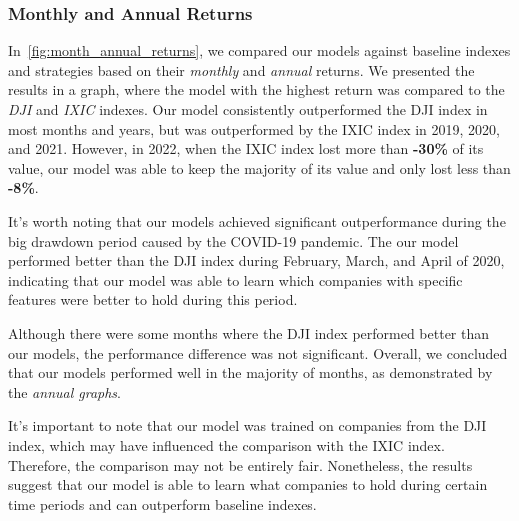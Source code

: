 \documentclass[../xlapes02]{subfiles}
\begin{document}
    \subsubsection{Monthly and Annual Returns}
    In~\cref{fig:month_annual_returns}, we compared our models against baseline indexes and strategies based on their \emph{monthly} and \emph{annual} returns. We presented the results in a graph, where the model with the highest return was compared to the \emph{DJI} and \emph{IXIC} indexes. Our model consistently outperformed the DJI index in most months and years, but was outperformed by the IXIC index in 2019, 2020, and 2021. However, in 2022, when the IXIC index lost more than \textbf{-30\%} of its value, our model was able to keep the majority of its value and only lost less than \textbf{-8\%}.

    It's worth noting that our models achieved significant outperformance during the big drawdown period caused by the COVID-19 pandemic. The our model performed better than the DJI index during February, March, and April of 2020, indicating that our model was able to learn which companies with specific features were better to hold during this period.

    Although there were some months where the DJI index performed better than our models, the performance difference was not significant. Overall, we concluded that our models performed well in the majority of months, as demonstrated by the \emph{annual graphs}.

    It's important to note that our model was trained on companies from the DJI index, which may have influenced the comparison with the IXIC index. Therefore, the comparison may not be entirely fair. Nonetheless, the results suggest that our model is able to learn what companies to hold during certain time periods and can outperform baseline indexes.
\end{document}

